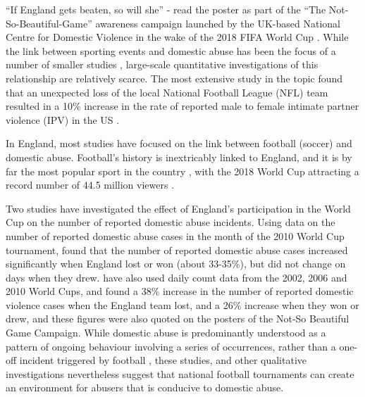 \documentclass[12pt, a4paper]{article}
\begin{document}
``If England gets beaten, so will she'' - read the poster as part of the ``The Not-So-Beautiful-Game'' awareness campaign launched by the UK-based National Centre for Domestic Violence in the wake of the 2018 FIFA World Cup \citep{NCDV}. While the link between sporting events and domestic abuse has been the focus of a number of smaller studies \citep{Williams2014}, large-scale quantitative investigations of this relationship are relatively scarce. The most extensive study in the topic found that an unexpected loss of the local National Football League (NFL) team resulted in a 10\% increase in the rate of reported male to female intimate partner violence (IPV) in the US \citep{Card2011}. 



In England, most studies have focused on the link between football (soccer) and domestic abuse. Football's history is inextricably linked to England, and it is by far the most popular sport in the country \citep{Parry2014}, with the 2018 World Cup attracting a record number of 44.5 million viewers \citep{BBC}. 
%


Two studies have investigated the effect of England's participation in the World Cup on the number of reported domestic abuse incidents. Using data on the number of reported domestic abuse cases in the month of the 2010 World Cup tournament, \citet{Brimicombe2012} found that the number of reported domestic abuse cases increased significantly when England lost or won (about 33-35\%), but did not change on days when they drew. \citet{Kirby2014} have also used daily count data from the 2002, 2006 and 2010 World Cups, and found a 38\% increase in the number of reported domestic violence cases when the England team lost, and a 26\% increase when they won or drew, and these figures were also quoted on the posters of the Not-So Beautiful Game Campaign. While domestic abuse is predominantly understood as a pattern of ongoing behaviour involving a series of occurrences, rather than a one-off incident triggered by football \citep{Brooks-Hay2018}, these studies, and other qualitative investigations \citep{Swallow} nevertheless suggest that national football tournaments can create an environment for abusers that is conducive to domestic abuse.
%
%
\end{document}
